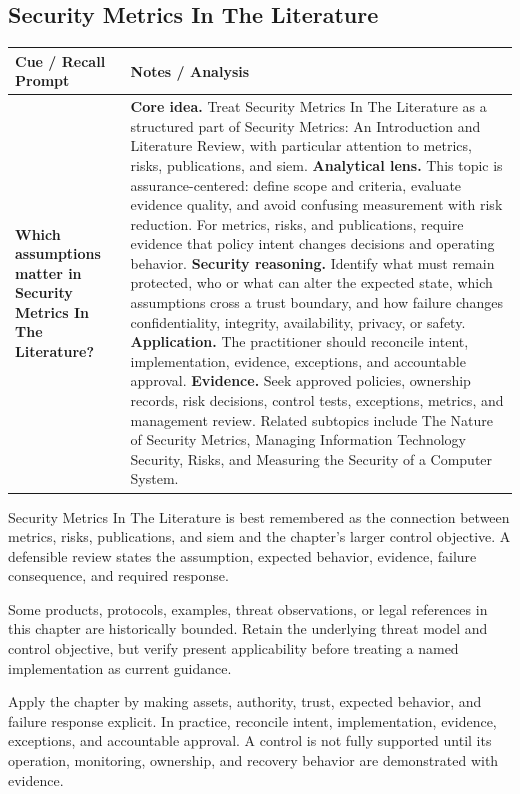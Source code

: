 \documentclass[11pt]{article}
\newcommand{\CornellHeader}{%
\rowcolor{Navy}\color{white}\bfseries Cue / Recall Prompt & \color{white}\bfseries Notes / Analysis\\\hline}
\newcommand{\CornellRow}[2]{%
\cellcolor{CueGray}\RaggedRight\textbf{#1} & \RaggedRight #2\\\hline}
\begin{document}
\subsection*{Security Metrics In The Literature}
\begin{longtable}{>{\RaggedRight\arraybackslash}p{}|>{\RaggedRight\arraybackslash}p{}}
\CornellHeader
\CornellRow{Which assumptions matter in Security Metrics In The Literature?}{\textbf{Core idea.} Treat Security Metrics In The Literature as a structured part of Security Metrics: An Introduction and Literature Review, with particular attention to metrics, risks, publications, and siem. \textbf{Analytical lens.} This topic is assurance-centered: define scope and criteria, evaluate evidence quality, and avoid confusing measurement with risk reduction. For metrics, risks, and publications, require evidence that policy intent changes decisions and operating behavior. \textbf{Security reasoning.} Identify what must remain protected, who or what can alter the expected state, which assumptions cross a trust boundary, and how failure changes confidentiality, integrity, availability, privacy, or safety. \textbf{Application.} The practitioner should reconcile intent, implementation, evidence, exceptions, and accountable approval. \textbf{Evidence.} Seek approved policies, ownership records, risk decisions, control tests, exceptions, metrics, and management review. Related subtopics include The Nature of Security Metrics, Managing Information Technology Security, Risks, and Measuring the Security of a Computer System.}
\end{longtable}
\begin{topicsummary}
Security Metrics In The Literature is best remembered as the connection between metrics, risks, publications, and siem and the chapter's larger control objective. A defensible review states the assumption, expected behavior, evidence, failure consequence, and required response.
\end{topicsummary}
\begin{historybox}
Some products, protocols, examples, threat observations, or legal references in this chapter are historically bounded. Retain the underlying threat model and control objective, but verify present applicability before treating a named implementation as current guidance.
\end{historybox}
\begin{defensebox}
Apply the chapter by making assets, authority, trust, expected behavior, and failure response explicit. In practice, reconcile intent, implementation, evidence, exceptions, and accountable approval. A control is not fully supported until its operation, monitoring, ownership, and recovery behavior are demonstrated with evidence.
\end{defensebox}
\end{document}

